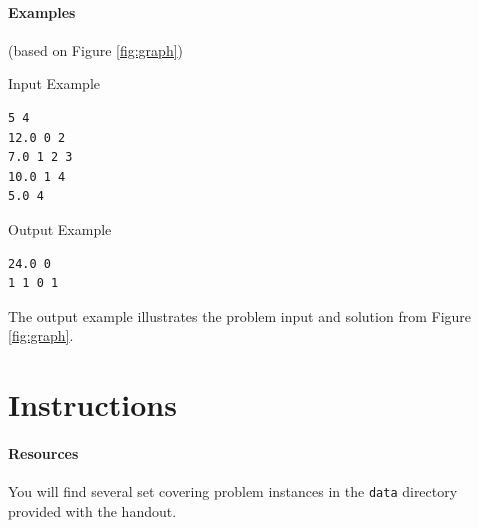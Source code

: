 \documentclass[11pt]{article}
\begin{document}
\clearpage
\paragraph{Examples}
(based on Figure \ref{fig:graph})

\vspace{0.2cm}
\noindent
Input Example
\vspace{-0.2cm}
\begin{Verbatim}[frame=single]
5 4
12.0 0 2
7.0 1 2 3
10.0 1 4 
5.0 4
\end{Verbatim}

\vspace{0.2cm}
\noindent
Output Example
\vspace{-0.2cm}
\begin{Verbatim}[frame=single]
24.0 0
1 1 0 1
\end{Verbatim}
%
The output example illustrates the problem input and solution from Figure \ref{fig:graph}.

\section{Instructions}




\paragraph{Resources}
You will find several set covering problem instances in the \texttt{data} directory provided with the handout.






\end{document}
